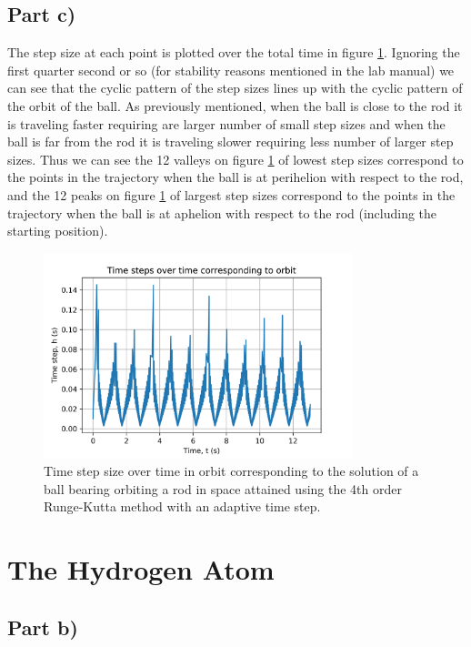 \documentclass{article}
\begin{document}
\subsection{Part c)}
The step size at each point is plotted over the total time in figure \ref{fig:q1_c}. Ignoring the first quarter second or so (for stability reasons mentioned in the lab manual) we can see that the cyclic pattern of the step sizes lines up with the cyclic pattern of the orbit of the ball. As previously mentioned, when the ball is close to the rod it is traveling faster requiring are larger number of small step sizes and when the ball is far from the rod it is traveling slower requiring less number of larger step sizes. Thus we can see the 12 valleys on figure \ref{fig:q1_c} of lowest step sizes correspond to the points in the trajectory when the ball is at perihelion with respect to the rod, and the 12 peaks on figure \ref{fig:q1_c} of largest step sizes correspond to the points in the trajectory when the ball is at aphelion with respect to the rod (including the starting position).  

\begin{figure}[H]
	\centering
	\includegraphics[width=0.8\textwidth]{../images/q1_orbit_step.png}
	\caption{Time step size over time in orbit corresponding to the solution of a ball bearing orbiting a rod in space attained using the 4th order Runge-Kutta method with an adaptive time step.}
	\label{fig:q1_c}
\end{figure}

\section{The Hydrogen Atom}

\subsection{Part b)}
\end{document}
